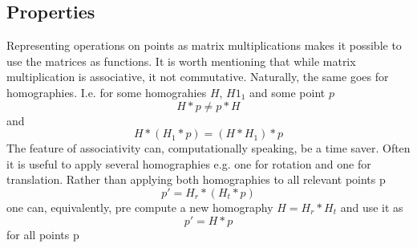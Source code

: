 \subsection{Properties}
Representing operations on points as matrix multiplications makes it possible
to use the matrices as functions. It is worth mentioning that while matrix
multiplication is associative, it not commutative. Naturally, the same goes for
homographies. I.e. for some homograhies $H$, $H1_{1}$ and some point $p$ $$H*p
\ne p*H$$ and $$H*(H_{1}*p) = (H*H_{1})*p$$ The feature of associativity can,
computationally speaking, be a time saver. Often it is useful to apply several
homographies e.g. one for rotation and one for translation. Rather than
applying both homographies to all relevant points p $$p' = H_{r} * (H_{t} * p)$$ one
can, equivalently, pre compute a new homography $H=H_{r}*H_{t}$ and use it as
$$p' = H * p$$ for all points p
